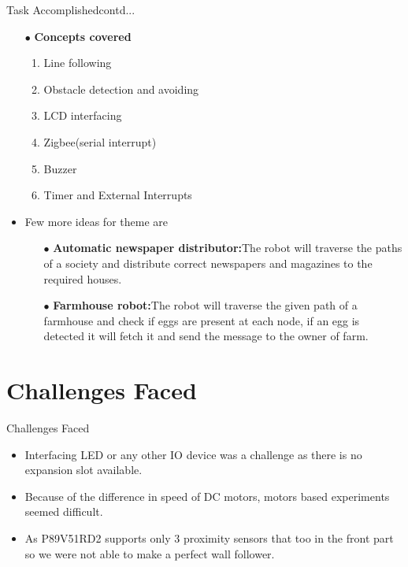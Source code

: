 \documentclass[10pt, a4paper]{beamer}
\begin{document}
\begin{frame}{Task Accomplished}{contd...}
\begin{itemize}
\begin{itemize}
\begin{figure}[h]
		\end{figure}
		\framebreak
			\item[$\bullet$]\textbf{Concepts covered } \newline
				\begin{enumerate}
					\item Line following \newline
					\item Obstacle detection and avoiding \newline
					\item LCD interfacing \newline
					\item Zigbee(serial interrupt) \newline
					\item Buzzer \newline
					\item Timer and External Interrupts \newline
				\end{enumerate}
				\framebreak
			\item Few more ideas for theme are \newline \newline
			 \begin{itemize}
			 	\item[$\bullet$]\textbf{Automatic newspaper distributor:}The robot will traverse the paths of a society and distribute correct newspapers and magazines to the required houses.\newline \newline
			 	\item[$\bullet$]\textbf{Farmhouse robot:}The robot will traverse the given path of a farmhouse and check if eggs are present at each node, if an egg is detected it will fetch it and send the message to the owner of farm.    
			 \end{itemize}
		\end{itemize}		 
	\end{itemize}
\end{frame}

\section{Challenges Faced}
\begin{frame}{Challenges Faced}
	\begin{itemize}
		\item Interfacing LED or any other IO device was a challenge as there is no expansion slot available.
		 \newline
		\item Because of the difference in speed of DC motors, motors based experiments seemed difficult.
		 \newline
		\item As P89V51RD2 supports only 3 proximity sensors that too in the front part so we were not able to make a perfect wall follower.
	\end{itemize}
\end{frame}
\end{document}
